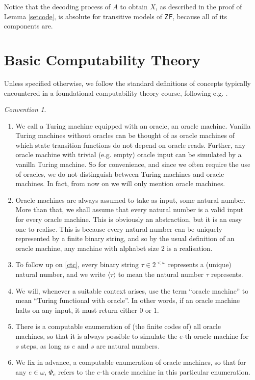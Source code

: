 \documentclass[12pt, twoside]{memoir}
\numberwithin{equation}{section}
\theoremstyle{definition}
\theoremstyle{remark}
\newtheorem{con}[thm]{Convention}
\theoremstyle{definition}
\theoremstyle{definition}
\theoremstyle{definition}
\theoremstyle{remark}
\begin{document}
Notice that the decoding process of $A$ to obtain $X$, as described in the proof of Lemma \ref{setcode}, is absolute for transitive models of $\mathsf{ZF}$, because all of its components are. 

\section{Basic Computability Theory}

Unless specified otherwise, we follow the standard definitions of concepts typically encountered in a foundational computability theory course, following e.g. \cite{soarebook}.

\begin{con}\label{comcon}
\leavevmode
\begin{enumerate}[label=(\arabic*)]
    \item\label{cc1} We call a Turing machine equipped with an oracle, an oracle machine. Vanilla Turing machines without oracles can be thought of as oracle machines of which state transition functions do not depend on oracle reads. Further, any oracle machine with trivial (e.g. empty) oracle input can be simulated by a vanilla Turing machine. So for convenience, and since we often require the use of oracles, we do not distinguish between Turing machines and oracle machines. In fact, from now on we will only mention oracle machines.
    \item\label{ctc} Oracle machines are always assumed to take as input, some natural number. More than that, we shall assume that every natural number is a valid input for every oracle machine. This is obviously an abstraction, but it is an easy one to realise. This is because every natural number can be uniquely represented by a finite binary string, and so by the usual definition of an oracle machine, any machine with alphabet size $2$ is a realisation.
    \item To follow up on \ref{ctc}, every binary string $\tau \in 2^{< \omega}$ represents a (unique) natural number, and we write $\langle \tau \rangle$ to mean the natural number $\tau$ represents.
    \item We will, whenever a suitable context arises, use the term ``oracle machine'' to mean ``Turing functional with oracle''. In other words, if an oracle machine halts on any input, it must return either $0$ or $1$. 
    \item There is a computable enumeration of (the finite codes of) all oracle machines, so that it is always possible to simulate the $e$-th oracle machine for $s$ steps, as long as $e$ and $s$ are natural numbers.
    \item We fix in advance, a computable enumeration of oracle machines, so that for any $e \in \omega$, $\Phi_e$ refers to the $e$-th oracle machine in this particular enumeration.
\end{enumerate}
\end{con}
\end{document}
